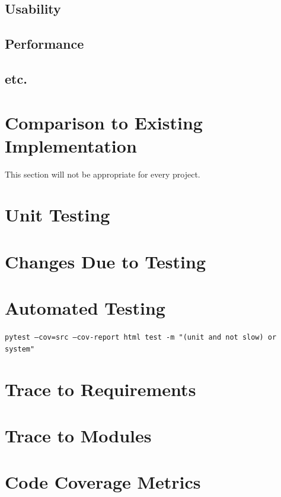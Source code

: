 \documentclass[12pt, titlepage]{article}
\begin{document}
\subsection{Usability}
		
\subsection{Performance}

\subsection{etc.}
	
\section{Comparison to Existing Implementation}	

This section will not be appropriate for every project.

\section{Unit Testing}

\section{Changes Due to Testing}


\section{Automated Testing} \label{sec:AutomatedTesting}
\texttt{pytest --cov=src --cov-report html test -m "(unit and not slow) or system"}
		
\section{Trace to Requirements}
		
\section{Trace to Modules}		

\section{Code Coverage Metrics}
\end{document}
